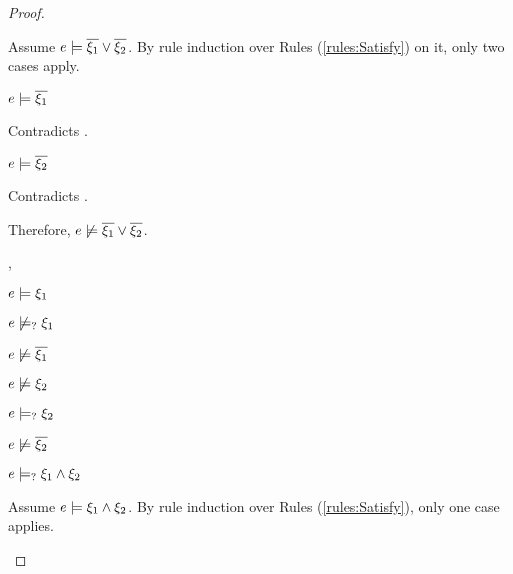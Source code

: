 \begin{proof}
\begin{byCases}
\begin{byCases}
        Assume $e \models \overline{\xi_1} \vee \overline{\xi_2}$. By rule induction over Rules (\ref{rules:Satisfy}) on it, only two cases apply.
        \begin{byCases}
        \item[\text{(\ref{rule:CSOr1})}]
            \begin{pfsteps*}
            \item $e \models \overline{\xi_1}$ 
            \end{pfsteps*}
            Contradicts .
        \item[\text{(\ref{rule:CSOr2})}]
            \begin{pfsteps*}
            \item $e \models \overline{\xi_2}$ 
            \end{pfsteps*}
            Contradicts .
        \end{byCases}
        Therefore, $e \not\models \overline{\xi_1} \vee \overline{\xi_2}$.
    \item[\csatisfy{e}{\xi_1},\cmaysatisfy{e}{\xi_2}]
        \begin{pfsteps*}
        \item $e \models \xi_1$  
        \item $e \not\models_{?} \xi_1$  
        \item $e \not\models \overline{\xi_1}$  
        \item $e \not\models \xi_2$  
        \item $e \models_{?} \xi_2$  
        \item $e \not\models \overline{\xi_2}$  
        \item $e \models_{?} \xi_1 \wedge \xi_2$  
        \end{pfsteps*}
        Assume $e \models \xi_1 \wedge \xi_2$. By rule induction over Rules (\ref{rules:Satisfy}), only one case applies.
        \begin{byCases}
        \item[\text{(\ref{rule:CSAnd})}]

\end{byCases}
\end{byCases}
\end{byCases}
\end{proof}
